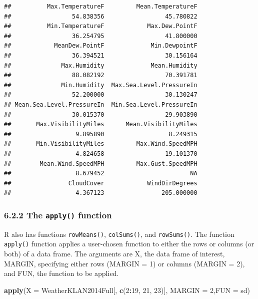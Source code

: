 \documentclass[]{article}
\newenvironment{Shaded}{\begin{snugshade}}{\end{snugshade}}
\newcommand{\KeywordTok}[1]{\textcolor[rgb]{0.13,0.29,0.53}{\textbf{#1}}}
\newcommand{\DataTypeTok}[1]{\textcolor[rgb]{0.13,0.29,0.53}{#1}}
\newcommand{\DecValTok}[1]{\textcolor[rgb]{0.00,0.00,0.81}{#1}}
\newcommand{\OperatorTok}[1]{\textcolor[rgb]{0.81,0.36,0.00}{\textbf{#1}}}
\newcommand{\NormalTok}[1]{#1}
\begin{document}
\begin{verbatim}
##          Max.TemperatureF         Mean.TemperatureF 
##                 54.838356                 45.780822 
##          Min.TemperatureF            Max.Dew.PointF 
##                 36.254795                 41.800000 
##            MeanDew.PointF             Min.DewpointF 
##                 36.394521                 30.156164 
##              Max.Humidity             Mean.Humidity 
##                 88.082192                 70.391781 
##              Min.Humidity  Max.Sea.Level.PressureIn 
##                 52.200000                 30.130247 
## Mean.Sea.Level.PressureIn  Min.Sea.Level.PressureIn 
##                 30.015370                 29.903890 
##       Max.VisibilityMiles      Mean.VisibilityMiles 
##                  9.895890                  8.249315 
##       Min.VisibilityMiles         Max.Wind.SpeedMPH 
##                  4.824658                 19.101370 
##        Mean.Wind.SpeedMPH         Max.Gust.SpeedMPH 
##                  8.679452                        NA 
##                CloudCover            WindDirDegrees 
##                  4.367123                205.000000
\end{verbatim}

\subsubsection{\texorpdfstring{6.2.2 The \texttt{apply()}
function}{6.2.2 The apply() function}}\label{the-apply-function}

R also has functions \texttt{rowMeans()}, \texttt{colSums()}, and
\texttt{rowSums()}. The function \texttt{apply()} function applies a
user-chosen function to either the rows or columns (or both) of a data
frame. The arguments are X, the data frame of interest, MARGIN,
specifying either rows (MARGIN = 1) or columns (MARGIN = 2), and FUN,
the function to be applied.

\begin{Shaded}
\begin{Highlighting}[]
\KeywordTok{apply}\NormalTok{(}\DataTypeTok{X =}\NormalTok{ WeatherKLAN2014Full[, }\KeywordTok{c}\NormalTok{(}\DecValTok{2}\OperatorTok{:}\DecValTok{19}\NormalTok{, }\DecValTok{21}\NormalTok{, }\DecValTok{23}\NormalTok{)], }\DataTypeTok{MARGIN =} \DecValTok{2}\NormalTok{,}\DataTypeTok{FUN =}\NormalTok{ sd)}
\end{Highlighting}
\end{Shaded}
\end{document}
